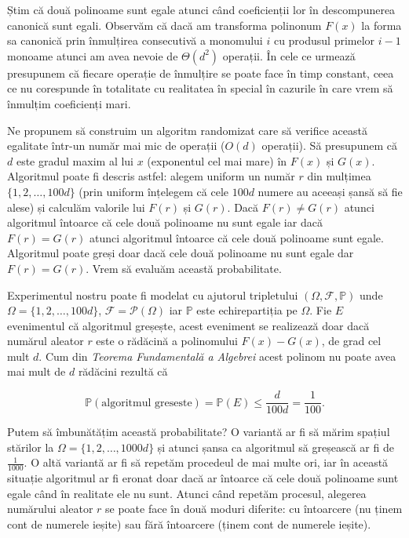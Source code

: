 \documentclass[]{article}
\begin{document}
Știm că două polinoame sunt egale atunci când coeficienții lor în
descompunerea canonică sunt egali. Observăm că dacă am transforma
polinonum \(F(x)\) la forma sa canonică prin înmulțirea consecutivă a
monomului \(i\) cu produsul primelor \(i-1\) monoame atunci am avea
nevoie de \(\Theta(d^2)\) operații. În cele ce urmează presupunem că
fiecare operație de înmulțire se poate face în timp constant, ceea ce nu
corespunde în totalitate cu realitatea în special în cazurile în care
vrem să înmulțim coeficienți mari.

Ne propunem să construim un algoritm randomizat care să verifice această
egalitate într-un număr mai mic de operații (\(O(d)\) operații). Să
presupunem că \(d\) este gradul maxim al lui \(x\) (exponentul cel mai
mare) în \(F(x)\) și \(G(x)\). Algoritmul poate fi descris astfel:
alegem uniform un număr \(r\) din mulțimea \(\{1,2,\ldots,100d\}\) (prin
uniform înțelegem că cele \(100d\) numere au aceeași șansă să fie alese)
și calculăm valorile lui \(F(r)\) și \(G(r)\). Dacă \(F(r)\neq G(r)\)
atunci algoritmul întoarce că cele două polinoame nu sunt egale iar dacă
\(F(r)=G(r)\) atunci algoritmul întoarce că cele două polinoame sunt
egale. Algoritmul poate greși doar dacă cele două polinoame nu sunt
egale dar \(F(r)=G(r)\). Vrem să evaluăm această probabilitate.

Experimentul nostru poate fi modelat cu ajutorul tripletului
\((\Omega, \mathcal{F}, \mathbb{P})\) unde
\(\Omega = \{1,2,\ldots,100d\}\), \(\mathcal{F}=\mathcal{P}(\Omega)\)
iar \(\mathbb{P}\) este echirepartiția pe \(\Omega\). Fie \(E\)
evenimentul că algoritmul greșește, acest eveniment se realizează doar
dacă numărul aleator \(r\) este o rădăcină a polinomului \(F(x)-G(x)\),
de grad cel mult \(d\). Cum din \emph{Teorema Fundamentală a Algebrei}
acest polinom nu poate avea mai mult de \(d\) rădăcini rezultă că

\[
  \mathbb{P}(\text{algoritmul greseste}) = \mathbb{P}(E) \leq \frac{d}{100d} = \frac{1}{100}.
\]

Putem să îmbunătățim această probabilitate? O variantă ar fi să mărim
spațiul stărilor la \(\Omega = \{1,2,\ldots,1000d\}\) și atunci șansa ca
algoritmul să greșească ar fi de \(\frac{1}{1000}\). O altă variantă ar
fi să repetăm procedeul de mai multe ori, iar în această situație
algoritmul ar fi eronat doar dacă ar întoarce că cele două polinoame
sunt egale când în realitate ele nu sunt. Atunci când repetăm procesul,
alegerea numărului aleator \(r\) se poate face în două moduri diferite:
cu întoarcere (nu ținem cont de numerele ieșite) sau fără întoarcere
(ținem cont de numerele ieșite).
\end{document}
